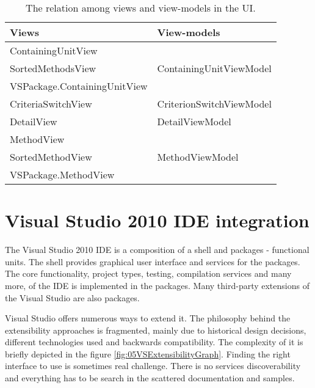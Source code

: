 \begin{table}
\centering
    \begin{tabular}{|l|l|}
        \hline
        \textbf{Views}                                                      & \textbf{View-models }    \\ \hline
        ContainingUnitView 													&       				   \\ 
        SortedMethodsView 													& ContainingUnitViewModel  \\ 
        VSPackage.ContainingUnitView 										&   					   \\ \hline
        CriteriaSwitchView                                                  & CriterionSwitchViewModel \\ \hline
        DetailView                                                          & DetailViewModel          \\ \hline
        MethodView										                    &                          \\
        SortedMethodView								                    & MethodViewModel          \\
        VSPackage.MethodView                                                &                          \\ \hline
    \end{tabular}
    \caption{The relation among views and view-models in the UI.}
   	\label{tab:05viewviewmodels}
    	
\end{table}


\section{Visual Studio 2010 IDE integration}
The Visual Studio 2010 IDE is a composition of a shell and packages - functional units. The shell provides graphical user interface and services for the packages. The core functionality, project types, testing, compilation services and many more, of the IDE is implemented in the packages. Many third-party extensions of the Visual Studio are also packages.

Visual Studio offers numerous ways to extend it. The philosophy behind the extensibility approaches is fragmented, mainly due to historical design decisions, different technologies used and backwards compatibility. The complexity of it is briefly depicted in the figure \ref{fig:05VSExtensibilityGraph}. Finding the right interface to use is sometimes real challenge. There is no services discoverability and everything has to be search in the scattered documentation and samples.


